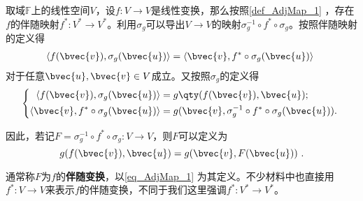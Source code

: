 取域$\mathbb{F}$上的线性空间$V$，设$f:V\to V$是线性变换，那么按照\autoref{def_AdjMap_1} ，存在$f$的伴随映射$f^*:V^*\to V^*$。利用$\sigma_g$可以导出$V\to V$的映射$\sigma_g^{-1}\circ f^*\circ \sigma_g$。按照伴随映射的定义得
\begin{equation}
\begin{aligned}
\langle f(\bvec{v}), \sigma_g(\bvec{u}) \rangle = \langle \bvec{v} , f^*\circ \sigma_g(\bvec{u}) \rangle
\end{aligned}~
\end{equation}
对于任意$\bvec{u}, \bvec{v}\in V$成立。又按照$\sigma_g$的定义得
\begin{equation}
\left\{
\begin{aligned}
\langle f(\bvec{v}), \sigma_g(\bvec{u}) \rangle ={}& g\qty(f(\bvec{v}), \bvec{u}); \\
\langle \bvec{v} , f^*\circ \sigma_g(\bvec{u}) \rangle={}& g(\bvec{v}, \sigma_g^{-1}\circ f^*\circ \sigma_g(\bvec{u})). 
\end{aligned}
\right. ~
\end{equation}

因此，若记$F=\sigma_g^{-1}\circ f^*\circ \sigma_g:V\to V$，则$F$可以定义为
\begin{equation}\label{eq_AdjMap_1}
g(f(\bvec{v}), \bvec{u}) = g(\bvec{v}, F(\bvec{u}))~. 
\end{equation}

通常称$F$为$f$的\textbf{伴随变换}，以\autoref{eq_AdjMap_1} 为其定义。不少材料中也直接用$f^*:V\to V$来表示$f$的伴随变换，不同于我们这里强调$f^*:V^*\to V^*$。




















